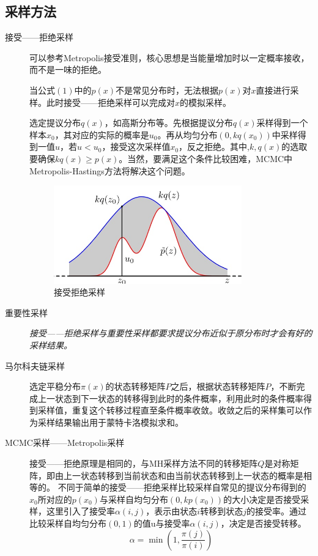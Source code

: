 \documentclass{ctexart}
\begin{document}
\subsection{采样方法}
\label{sampling}
\begin{description}

\item[接受——拒绝采样]
可以参考Metropolis接受准则，核心思想是当能量增加时以一定概率接收，而不是一味的拒绝。

当公式$\left(1\right)$中的$p\left(x\right)$不是常见分布时，无法根据$p\left(x\right)$对$x$直接进行采样。此时接受——拒绝采样可以完成对$x$的模拟采样。

选定提议分布$q\left(x\right)$，如高斯分布等。先根据提议分布$q\left(x\right)$采样得到一个样本$x_0$，其对应的实际的概率是$u_0$。再从均匀分布$\left(0,kq\left(x_0\right)\right)$中采样得到一值$u$，若$u<u_0$，接受这次采样值$x_0$，反之拒绝。其中,$k,q\left(x\right)$的选取要确保$kq\left(x\right)\ge p\left(x\right)$。当然，要满足这个条件比较困难，MCMC中Metropolis-Hastings方法将解决这个问题。

\begin{figure}[H]
\begin{center}
\includegraphics[width=0.8\textwidth]{fig/kq(x)--x.jpg} %
\caption{接受拒绝采样}
\end{center}
\end{figure}

\item[重要性采样]
\emph{接受——拒绝采样与重要性采样都要求提议分布近似于原分布时才会有好的采样结果。}

\item[马尔科夫链采样]
选定平稳分布$\pi \left(x\right)$的状态转移矩阵$P$之后，根据状态转移矩阵$P$，不断完成上一状态到下一状态的转移得到此时的条件概率，利用此时的条件概率得到采样值，重复这个转移过程直至条件概率收敛。收敛之后的采样集可以作为采样结果输出用于蒙特卡洛模拟求和。

\item[MCMC采样——Metropolis采样]
接受——拒绝原理是相同的，与MH采样方法不同的转移矩阵$Q$是对称矩阵，即由上一状态转移到当前状态和由当前状态转移到上一状态的概率是相等的。
不同于简单的接受——拒绝采样比较采样自常见的提议分布得到的$x_0$所对应的$p\left(x_0\right)$与采样自均匀分布$\left(0,kp\left(x_0\right)\right)$的大小决定是否接受采样，这里引入了接受率$\alpha\left(i,j\right)$，表示由状态$i$转移到状态$j$的接受率。通过比较采样自均匀分布$\left(0,1\right)$的值u与接受率$\alpha\left(i,j\right)$，决定是否接受转移。
\begin{equation}
\alpha = \min\left(1,\frac{\pi\left(j\right)}{\pi\left(i\right)}\right)
\end{equation}


\end{description}
\end{document}
